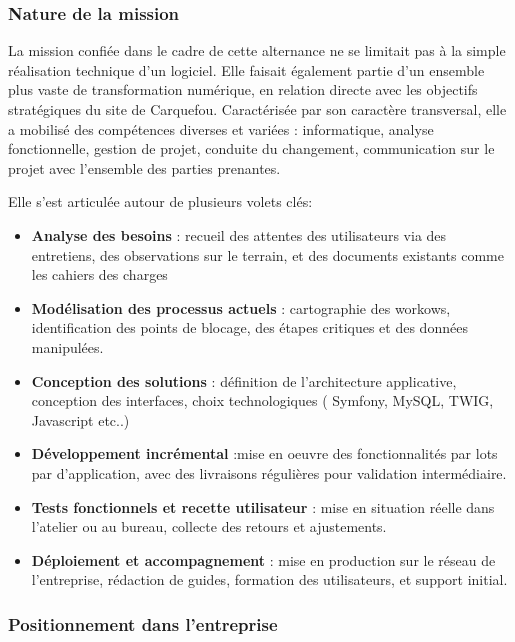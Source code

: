 \documentclass[11pt,a4paper]{article}
\begin{document}
\subsubsection{Nature de la mission}
La mission confiée dans le cadre de cette alternance ne se limitait pas à la simple réalisation technique d’un logiciel. Elle faisait également partie d’un ensemble plus vaste de transformation numérique, en relation directe avec les objectifs stratégiques du site de Carquefou. Caractérisée par son caractère transversal, elle a mobilisé des compétences diverses et variées : informatique, analyse fonctionnelle, gestion de projet, conduite du changement, communication sur le projet avec l’ensemble des parties prenantes.

Elle s'est articulée autour de plusieurs volets clés:


\begin{itemize}

    \item \textbf{Analyse des besoins} : recueil des attentes des utilisateurs via des entretiens, des observations sur le terrain, et des documents existants comme les cahiers des charges
    
    \item \textbf{Modélisation des processus actuels} : cartographie des workows, identification des points de blocage, des étapes critiques et des données manipulées.
       
    \item \textbf{Conception des solutions} : définition de l'architecture applicative, conception des interfaces, choix technologiques ( Symfony, MySQL, TWIG, Javascript etc..)
    
    \item \textbf{Développement incrémental} :mise en oeuvre des fonctionnalités par lots par d'application, avec des livraisons régulières pour validation intermédiaire.
    
    \item \textbf{Tests fonctionnels et recette utilisateur} : mise en situation réelle dans l'atelier ou au bureau, collecte des retours et ajustements.
    
    \item \textbf{Déploiement et accompagnement} : mise en production sur le réseau de l’entreprise, rédaction de guides, formation des utilisateurs, et support initial.
\end{itemize}

\subsubsection{Positionnement dans l’entreprise}
\end{document}
